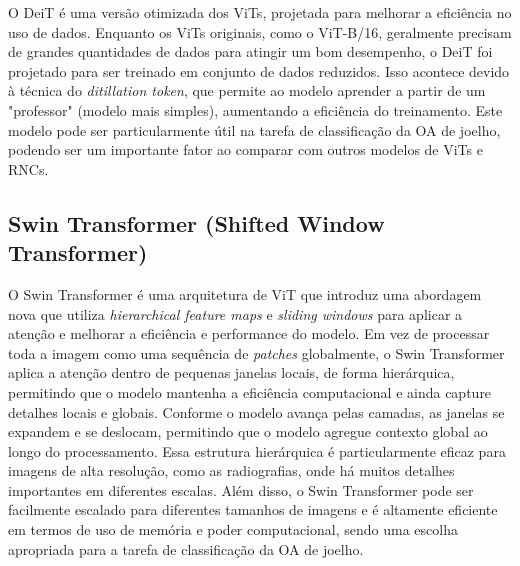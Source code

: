 O DeiT \cite{Touvron2021} é uma versão otimizada dos ViTs, projetada para melhorar a eficiência no uso de dados. Enquanto os ViTs originais, como o ViT-B/16, geralmente precisam de grandes quantidades de dados para atingir um bom desempenho, o DeiT foi projetado para ser treinado em conjunto de dados reduzidos. Isso acontece devido à técnica do \textit{ditillation token}, que permite ao modelo aprender a partir de um "professor" (modelo mais simples), aumentando a eficiência do treinamento. Este modelo pode ser particularmente útil na tarefa de classificação da OA de joelho, podendo ser um importante fator ao comparar com outros modelos de ViTs e RNCs.

\subsection{Swin Transformer (Shifted Window Transformer)}

O Swin Transformer \cite{Liu2021} é uma arquitetura de ViT que introduz uma abordagem nova que utiliza \textit{hierarchical feature maps} e \textit{sliding windows} para aplicar a atenção e melhorar a eficiência e performance do modelo. Em vez de processar toda a imagem como uma sequência de \textit{patches} globalmente, o Swin Transformer aplica a atenção dentro de pequenas janelas locais, de forma hierárquica, permitindo que o modelo mantenha a eficiência computacional e ainda capture detalhes locais e globais. Conforme o modelo avança pelas camadas, as janelas se expandem e se deslocam, permitindo que o modelo agregue contexto global ao longo do processamento. Essa estrutura hierárquica é particularmente eficaz para imagens de alta resolução, como as radiografias, onde há muitos detalhes importantes em diferentes escalas. Além disso, o Swin Transformer pode ser facilmente escalado para diferentes tamanhos de imagens e é altamente eficiente em termos de uso de memória e poder computacional, sendo uma escolha apropriada para a tarefa de classificação da OA de joelho.



